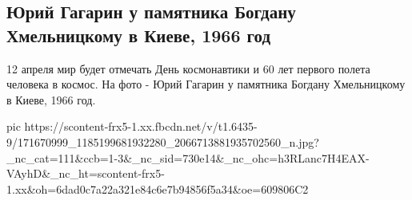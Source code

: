  
 
 
 
 
\subsection{Юрий Гагарин у памятника Богдану Хмельницкому в Киеве, 1966 год}

12 апреля мир будет отмечать День космонавтики и 60 лет первого полета человека в космос.
На фото - Юрий Гагарин у памятника Богдану Хмельницкому в Киеве, 1966 год.

\ifcmt
  pic https://scontent-frx5-1.xx.fbcdn.net/v/t1.6435-9/171670999_1185199681932280_2066713881935702560_n.jpg?_nc_cat=111&ccb=1-3&_nc_sid=730e14&_nc_ohc=h3RLanc7H4EAX-VAyhD&_nc_ht=scontent-frx5-1.xx&oh=6dad0c7a22a321e84c6e7b94856f5a34&oe=609806C2
\fi

